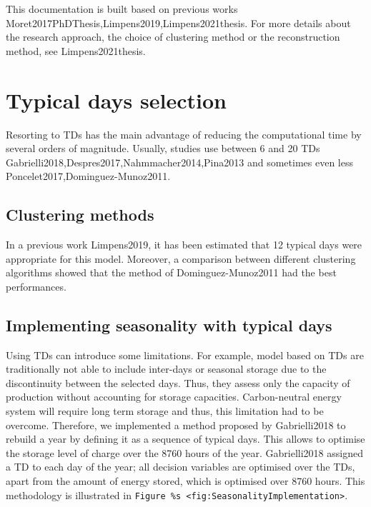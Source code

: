 \documentclass[
]{article}
\begin{document}
This documentation is built based on previous works
Moret2017PhDThesis,Limpens2019,Limpens2021thesis. For more details about
the research approach, the choice of clustering method or the
reconstruction method, see Limpens2021thesis.

\section{Typical days selection}\label{sec_td_selection}

Resorting to TDs has the main advantage of reducing the computational
time by several orders of magnitude. Usually, studies use between 6 and
20 TDs Gabrielli2018,Despres2017,Nahmmacher2014,Pina2013 and sometimes
even less Poncelet2017,Dominguez-Munoz2011.

\subsection{Clustering methods}\label{clustering-methods}

In a previous work Limpens2019, it has been estimated that 12 typical
days were appropriate for this model. Moreover, a comparison between
different clustering algorithms showed that the method of
Dominguez-Munoz2011 had the best performances.

\subsection{Implementing seasonality with typical
days}\label{implementing-seasonality-with-typical-days}

Using TDs can introduce some limitations. For example, model based on
TDs are traditionally not able to include inter-days or seasonal storage
due to the discontinuity between the selected days. Thus, they assess
only the capacity of production without accounting for storage
capacities. Carbon-neutral energy system will require long term storage
and thus, this limitation had to be overcome. Therefore, we implemented
a method proposed by Gabrielli2018 to rebuild a year by defining it as a
sequence of typical days. This allows to optimise the storage level of
charge over the 8760 hours of the year. Gabrielli2018 assigned a TD to
each day of the year; all decision variables are optimised over the TDs,
apart from the amount of energy stored, which is optimised over 8760
hours. This methodology is illustrated in
\texttt{Figure\ \%s\ \textless{}fig:SeasonalityImplementation\textgreater{}}.
\end{document}
